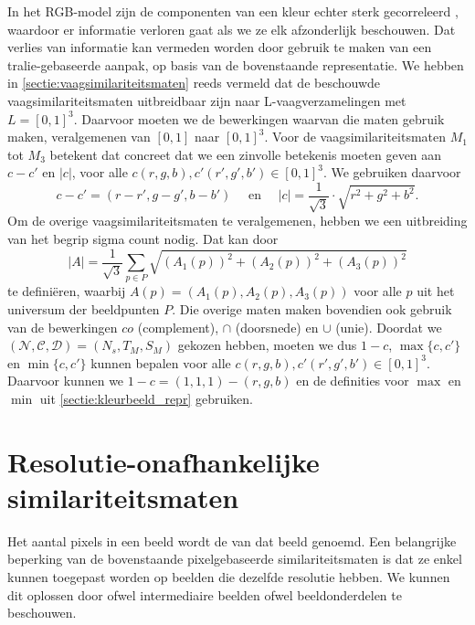 In het RGB-model zijn de componenten van een kleur echter sterk gecorreleerd 
\cite{sharma:digital_color_imaging}, waardoor er
informatie verloren gaat als we ze elk afzonderlijk beschouwen. Dat verlies van informatie kan vermeden
worden door gebruik te maken van een tralie-gebaseerde aanpak,
op basis van de bovenstaande representatie.
We hebben in \ref{sectie:vaagsimilariteitsmaten} reeds vermeld dat de beschouwde 
vaagsimilariteitsmaten uitbreidbaar zijn naar L-vaag\-ver\-za\-me\-ling\-en met
$L=[0,1]^3$. Daarvoor moeten we de bewerkingen waarvan die maten gebruik maken, veralgemenen van 
$[0,1]$ naar $[0,1]^3$. 
Voor de vaagsimilariteitsmaten $M_1$ tot $M_3$ betekent dat concreet dat we een zinvolle betekenis 
moeten geven aan $c - c'$ en $|c|$, voor alle $c(r,g,b),c'(r',g',b') \in [0,1]^3$. We gebruiken
daarvoor 
\begin{displaymath}
c - c' = (r-r',g-g',b-b') \quad \textrm{ en } \quad |c| = \frac{1}{\sqrt{3}} \cdot \sqrt{r^2 + g^2 + b^2}.
\end{displaymath}
Om de overige vaagsimilariteitsmaten te veralgemenen, hebben we een uitbreiding van het
begrip sigma count nodig. Dat kan door
\begin{displaymath}
|A|=\frac{1}{\sqrt{3}}\sum_{p \in P}\sqrt{(A_1(p))^2+(A_2(p))^2+(A_3(p))^2}
\end{displaymath}
te defini\"eren, waarbij $A(p)=(A_1(p),A_2(p),A_3(p))$ voor alle $p$ uit het
universum der beeldpunten $P$. Die overige maten maken 
bovendien ook gebruik van de bewerkingen $co$ (complement), 
$\cap$ (doorsnede) en $\cup$ (unie). Doordat we 
$(\mathcal{N},\mathcal{C},\mathcal{D})=(N_s,T_M,S_M)$ gekozen hebben, moeten we
dus $1 - c$, $\max \{c,c'\}$ en $\min \{c,c'\}$ kunnen bepalen voor alle 
$c(r,g,b),c'(r',g',b') \in [0,1]^3$. Daarvoor kunnen we $1 - c = (1,1,1) - (r,g,b)$ en de
definities voor $\max$ en $\min$ uit \ref{sectie:kleurbeeld_repr} gebruiken.


\section{Resolutie-onafhankelijke similariteitsmaten}
\label{sectie:res-onafh}

Het aantal pixels in een beeld wordt de  van dat beeld genoemd.
Een belangrijke beperking van de bovenstaande pixelgebaseerde similariteitsmaten is dat
ze enkel kunnen toegepast worden op beelden die dezelfde resolutie hebben.
We kunnen dit oplossen door ofwel intermediaire beelden ofwel beeldonderdelen te beschouwen.

